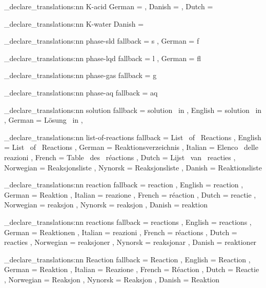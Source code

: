 
\chemmacros_declare_translations:nn {K-acid}
  {
    German =  ,
    Danish =  ,
    Dutch  = 
  }

\chemmacros_declare_translations:nn {K-water}
  { Danish =  }

\chemmacros_declare_translations:nn {phase-sld}
  {
    fallback = s ,
    German   = f
  }

\chemmacros_declare_translations:nn {phase-lqd}
  {
    fallback = l ,
    German   = f\/l
  }

\chemmacros_declare_translations:nn {phase-gas}
  { fallback = g }

\chemmacros_declare_translations:nn {phase-aq}
  { fallback = aq }

\chemmacros_declare_translations:nn {solution}
  {
    fallback = solution~ in ,
    English  = solution~ in ,
    German   = L\"osung~ in ,
  }

\chemmacros_declare_translations:nn {list-of-reactions}
  {
    fallback  = List~ of~ Reactions ,
    English   = List~ of~ Reactions ,
    German    = Reaktionsverzeichnis ,
    Italian   = Elenco~ delle~ reazioni ,
    French    = Table~ des~ r\'{e}actions ,
    Dutch     = Lijst~ van~ reacties ,
    Norwegian = Reaksjonsliste ,
    Nynorsk   = Reaksjonsliste ,
    Danish    = Reaktionsliste
  }

\chemmacros_declare_translations:nn {reaction}
  {
    fallback  = reaction ,
    English   = reaction ,
    German    = Reaktion ,
    Italian   = reazione ,
    French    = r\'{e}action ,
    Dutch     = reactie ,
    Norwegian = reaksjon ,
    Nynorsk   = reaksjon ,
    Danish    = reaktion
  }

\chemmacros_declare_translations:nn {reactions}
  {
    fallback  = reactions ,
    English   = reactions ,
    German    = Reaktionen ,
    Italian   = reazioni ,
    French    = r\'{e}actions ,
    Dutch     = reacties ,
    Norwegian = reaksjoner ,
    Nynorsk   = reaksjonar ,
    Danish    = reaktioner
  }

\chemmacros_declare_translations:nn {Reaction}
  {
    fallback  = Reaction ,
    English   = Reaction ,
    German    = Reaktion ,
    Italian   = Reazione ,
    French    = R\'{e}action ,
    Dutch     = Reactie ,
    Norwegian = Reaksjon ,
    Nynorsk   = Reaksjon ,
    Danish    = Reaktion
  }

